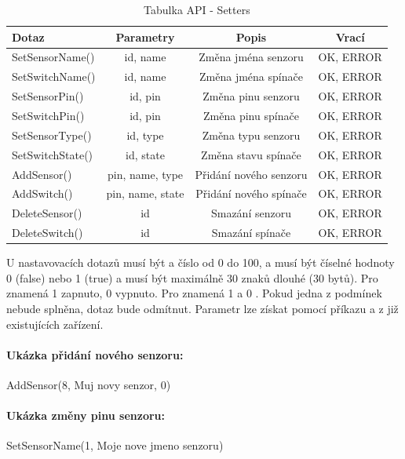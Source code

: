 \documentclass[FM,DP]{tulthesis}  %
\begin{document}
\renewcommand{\arraystretch}{1.5}
\begin{table}[H]
\begin{center}
\begin{tabular}{| l | c | c| c |}
\hline
Dotaz & Parametry & Popis & Vrací\\
\hline
\hline
SetSensorName() & id, name & Změna jména senzoru & OK, ERROR \\
\hline
SetSwitchName() & id, name & Změna jména spínače & OK, ERROR \\
\hline
SetSensorPin() & id, pin & Změna pinu senzoru & OK, ERROR \\
\hline
SetSwitchPin() & id, pin & Změna pinu spínače & OK, ERROR \\
\hline
SetSensorType() & id, type & Změna typu senzoru & OK, ERROR \\
\hline
SetSwitchState() & id, state & Změna stavu spínače & OK, ERROR \\
\hline
AddSensor() & pin, name, type & Přidání nového senzoru & OK, ERROR \\
\hline
AddSwitch() & pin, name, state & Přidání nového spínače & OK, ERROR \\
\hline
DeleteSensor() & id & Smazání senzoru & OK, ERROR \\
\hline
DeleteSwitch() & id & Smazání spínače & OK, ERROR \\
\hline
\end{tabular}
\end{center}
\caption{Tabulka API - Setters}
\end{table}

U nastavovacích dotazů musí být  a  číslo od 0 do 100,  a  musí být číselné hodnoty 0 (false) nebo 1 (true) a  musí být maximálně 30 znaků dlouhé (30 bytů). Pro  znamená 1 zapnuto, 0 vypnuto. Pro  znamená 1  a 0 . Pokud jedna z podmínek nebude splněna, dotaz bude odmítnut. Parametr  lze získat pomocí příkazu  a  z již existujících zařízení.

\paragraph{Ukázka přidání nového senzoru:}
\begin{center}
AddSensor(8, Muj novy senzor, 0)
\end{center}

\paragraph{Ukázka změny pinu senzoru:}
\begin{center}
SetSensorName(1, Moje nove jmeno senzoru)
\end{center}
\end{document}
